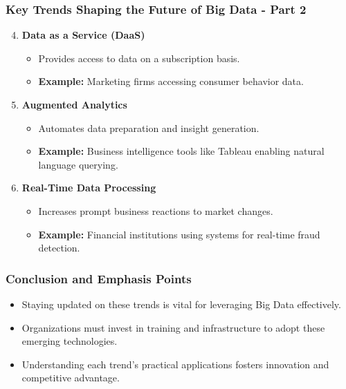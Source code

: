 \documentclass[aspectratio=169]{beamer}
\begin{document}
\begin{frame}[fragile]
    \frametitle{Key Trends Shaping the Future of Big Data - Part 2}
    \begin{enumerate}
        \setcounter{enumi}{3}
        \item \textbf{Data as a Service (DaaS)}
          \begin{itemize}
              \item Provides access to data on a subscription basis.
              \item \textbf{Example:} Marketing firms accessing consumer behavior data.
          \end{itemize}

        \item \textbf{Augmented Analytics}
          \begin{itemize}
              \item Automates data preparation and insight generation.
              \item \textbf{Example:} Business intelligence tools like Tableau enabling natural language querying.
          \end{itemize}

        \item \textbf{Real-Time Data Processing}
          \begin{itemize}
              \item Increases prompt business reactions to market changes.
              \item \textbf{Example:} Financial institutions using systems for real-time fraud detection.
          \end{itemize}
    \end{enumerate}
\end{frame}

\begin{frame}[fragile]
    \frametitle{Conclusion and Emphasis Points}
    \begin{itemize}
        \item Staying updated on these trends is vital for leveraging Big Data effectively.
        \item Organizations must invest in training and infrastructure to adopt these emerging technologies.
        \item Understanding each trend's practical applications fosters innovation and competitive advantage.
    \end{itemize}
\end{frame}
\end{document}
